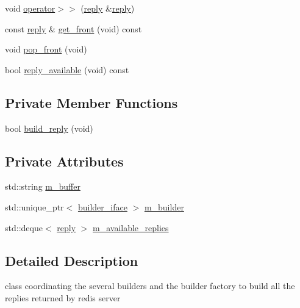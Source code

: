 \begin{DoxyCompactItemize}
\item 
void \hyperlink{classcpp__redis_1_1builders_1_1reply__builder_a71c0c93754b0bffb9c84c86ac3096bc4}{operator$>$$>$} (\hyperlink{classcpp__redis_1_1reply}{reply} \&\hyperlink{classcpp__redis_1_1reply}{reply})
\item 
const \hyperlink{classcpp__redis_1_1reply}{reply} \& \hyperlink{classcpp__redis_1_1builders_1_1reply__builder_ac37b532920ace20e24a40ea1c61940fe}{get\+\_\+front} (void) const
\item 
void \hyperlink{classcpp__redis_1_1builders_1_1reply__builder_a0b5fb8dd4fc87c508e0a45647bc86b16}{pop\+\_\+front} (void)
\item 
bool \hyperlink{classcpp__redis_1_1builders_1_1reply__builder_af7d8e764ab591390cd1eae8801cd691c}{reply\+\_\+available} (void) const
\end{DoxyCompactItemize}
\subsection*{Private Member Functions}
\begin{DoxyCompactItemize}
\item 
bool \hyperlink{classcpp__redis_1_1builders_1_1reply__builder_a81321518ad4fdf0d3feda5a2501a7827}{build\+\_\+reply} (void)
\end{DoxyCompactItemize}
\subsection*{Private Attributes}
\begin{DoxyCompactItemize}
\item 
std\+::string \hyperlink{classcpp__redis_1_1builders_1_1reply__builder_acc009138118b7d19511a52aa676ec7e6}{m\+\_\+buffer}
\item 
std\+::unique\+\_\+ptr$<$ \hyperlink{classcpp__redis_1_1builders_1_1builder__iface}{builder\+\_\+iface} $>$ \hyperlink{classcpp__redis_1_1builders_1_1reply__builder_a9f1994cfa23b943243d8261662155adb}{m\+\_\+builder}
\item 
std\+::deque$<$ \hyperlink{classcpp__redis_1_1reply}{reply} $>$ \hyperlink{classcpp__redis_1_1builders_1_1reply__builder_ae70f793556e3c67750226816560d7207}{m\+\_\+available\+\_\+replies}
\end{DoxyCompactItemize}


\subsection{Detailed Description}
class coordinating the several builders and the builder factory to build all the replies returned by redis server 

